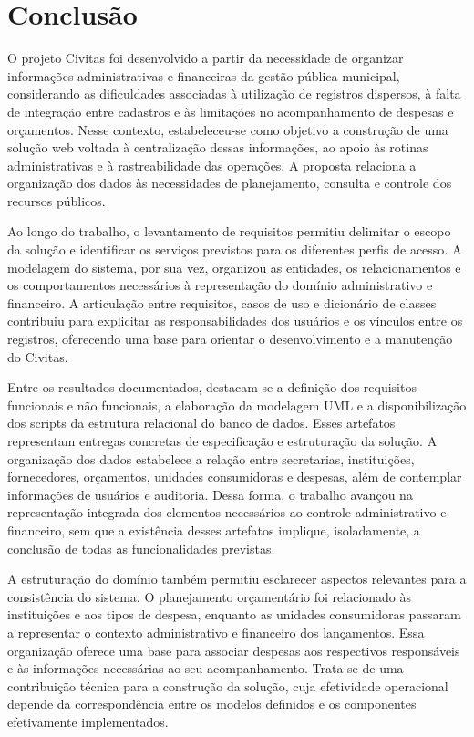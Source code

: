 \chapter{Conclusão}

O projeto Civitas foi desenvolvido a partir da necessidade de organizar informações administrativas e financeiras da gestão pública municipal, considerando as dificuldades associadas à utilização de registros dispersos, à falta de integração entre cadastros e às limitações no acompanhamento de despesas e orçamentos. Nesse contexto, estabeleceu-se como objetivo a construção de uma solução web voltada à centralização dessas informações, ao apoio às rotinas administrativas e à rastreabilidade das operações. A proposta relaciona a organização dos dados às necessidades de planejamento, consulta e controle dos recursos públicos.

Ao longo do trabalho, o levantamento de requisitos permitiu delimitar o escopo da solução e identificar os serviços previstos para os diferentes perfis de acesso. A modelagem do sistema, por sua vez, organizou as entidades, os relacionamentos e os comportamentos necessários à representação do domínio administrativo e financeiro. A articulação entre requisitos, casos de uso e dicionário de classes contribuiu para explicitar as responsabilidades dos usuários e os vínculos entre os registros, oferecendo uma base para orientar o desenvolvimento e a manutenção do Civitas.

Entre os resultados documentados, destacam-se a definição dos requisitos funcionais e não funcionais, a elaboração da modelagem UML e a disponibilização dos scripts da estrutura relacional do banco de dados. Esses artefatos representam entregas concretas de especificação e estruturação da solução. A organização dos dados estabelece a relação entre secretarias, instituições, fornecedores, orçamentos, unidades consumidoras e despesas, além de contemplar informações de usuários e auditoria. Dessa forma, o trabalho avançou na representação integrada dos elementos necessários ao controle administrativo e financeiro, sem que a existência desses artefatos implique, isoladamente, a conclusão de todas as funcionalidades previstas.

A estruturação do domínio também permitiu esclarecer aspectos relevantes para a consistência do sistema. O planejamento orçamentário foi relacionado às instituições e aos tipos de despesa, enquanto as unidades consumidoras passaram a representar o contexto administrativo e financeiro dos lançamentos. Essa organização oferece uma base para associar despesas aos respectivos responsáveis e às informações necessárias ao seu acompanhamento. Trata-se de uma contribuição técnica para a construção da solução, cuja efetividade operacional depende da correspondência entre os modelos definidos e os componentes efetivamente implementados.

